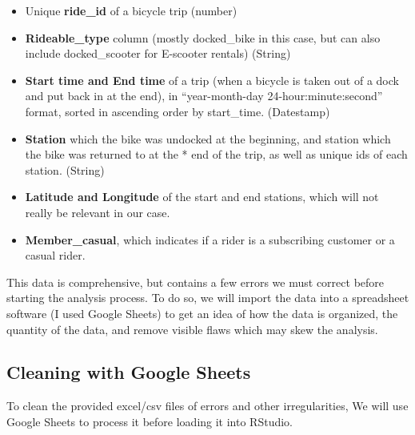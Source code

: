 \documentclass[
]{article}
\begin{document}
\begin{itemize}
\item
  Unique \textbf{ride\_id} of a bicycle trip (number)
\item
  \textbf{Rideable\_type} column (mostly docked\_bike in this case, but
  can also include docked\_scooter for E-scooter rentals) (String)
\item
  \textbf{Start time and End time} of a trip (when a bicycle is taken
  out of a dock and put back in at the end), in ``year-month-day
  24-hour:minute:second'' format, sorted in ascending order by
  start\_time. (Datestamp)
\item
  \textbf{Station} which the bike was undocked at the beginning, and
  station which the bike was returned to at the * end of the trip, as
  well as unique ids of each station. (String)
\item
  \textbf{Latitude and Longitude} of the start and end stations, which
  will not really be relevant in our case.
\item
  \textbf{Member\_casual}, which indicates if a rider is a subscribing
  customer or a casual rider.
\end{itemize}

This data is comprehensive, but contains a few errors we must correct
before starting the analysis process. To do so, we will import the data
into a spreadsheet software (I used Google Sheets) to get an idea of how
the data is organized, the quantity of the data, and remove visible
flaws which may skew the analysis.

\subsection{Cleaning with Google
Sheets}\label{cleaning-with-google-sheets}

To clean the provided excel/csv files of errors and other
irregularities, We will use Google Sheets to process it before loading
it into RStudio.
\end{document}
